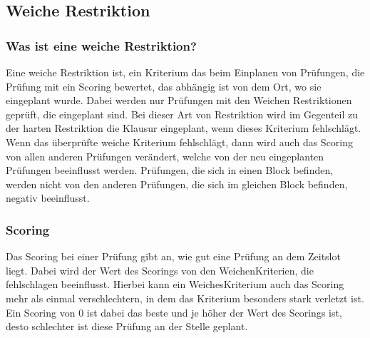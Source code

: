 \subsection{Weiche Restriktion}\label{subsec:weiche_restriktion}

\subsubsection{Was ist eine weiche Restriktion?}
Eine weiche Restriktion ist, ein Kriterium das beim Einplanen von Prüfungen, die Prüfung mit ein Scoring bewertet, das abhängig ist von dem Ort, wo sie eingeplant wurde.
Dabei werden nur Prüfungen mit den Weichen Restriktionen geprüft, die eingeplant sind.
Bei dieser Art von Restriktion wird im Gegenteil zu der harten Restriktion die Klausur eingeplant,
wenn dieses Kriterium fehlschlägt.
Wenn das überprüfte weiche Kriterium fehlschlägt, dann wird auch das Scoring von allen anderen Prüfungen verändert, welche von der neu eingeplanten Prüfungen beeinflusst werden.
Prüfungen, die sich in einen Block befinden, werden nicht von den anderen Prüfungen, die sich im gleichen Block befinden, negativ beeinflusst.

\subsubsection{Scoring}
Das Scoring bei einer Prüfung gibt an, wie gut eine Prüfung an dem Zeitslot liegt.
Dabei wird der Wert des Scorings von den WeichenKriterien, die fehlschlagen beeinflusst.
Hierbei kann ein WeichesKriterium auch das Scoring mehr als einmal verschlechtern, in dem das Kriterium
besonders stark verletzt ist.
Ein Scoring von 0 ist dabei das beste und je höher der Wert des Scorings ist, desto schlechter ist diese Prüfung an der Stelle geplant.











